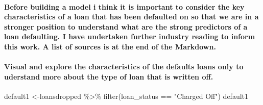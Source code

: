 \documentclass[
]{article}
\newenvironment{Shaded}{\begin{snugshade}}{\end{snugshade}}
\newcommand{\FunctionTok}[1]{\textcolor[rgb]{0.00,0.00,0.00}{#1}}
\newcommand{\NormalTok}[1]{#1}
\newcommand{\OtherTok}[1]{\textcolor[rgb]{0.56,0.35,0.01}{#1}}
\newcommand{\SpecialCharTok}[1]{\textcolor[rgb]{0.00,0.00,0.00}{#1}}
\newcommand{\StringTok}[1]{\textcolor[rgb]{0.31,0.60,0.02}{#1}}
\begin{document}
\hypertarget{before-building-a-model-i-think-it-is-important-to-consider-the-key-characteristics-of-a-loan-that-has-been-defaulted-on-so-that-we-are-in-a-stronger-position-to-understand-what-are-the-strong-predictors-of-a-loan-defaulting.-i-have-undertaken-further-industry-reading-to-inform-this-work.-a-list-of-sources-is-at-the-end-of-the-markdown.}{%
\paragraph{Before building a model i think it is important to consider
the key characteristics of a loan that has been defaulted on so that we
are in a stronger position to understand what are the strong predictors
of a loan defaulting. I have undertaken further industry reading to
inform this work. A list of sources is at the end of the
Markdown.}\label{before-building-a-model-i-think-it-is-important-to-consider-the-key-characteristics-of-a-loan-that-has-been-defaulted-on-so-that-we-are-in-a-stronger-position-to-understand-what-are-the-strong-predictors-of-a-loan-defaulting.-i-have-undertaken-further-industry-reading-to-inform-this-work.-a-list-of-sources-is-at-the-end-of-the-markdown.}}

\hypertarget{visual-and-explore-the-characteristics-of-the-defaults-loans-only-to-uderstand-more-about-the-type-of-loan-that-is-written-off.}{%
\paragraph{Visual and explore the characteristics of the defaults loans
only to uderstand more about the type of loan that is written
off.}\label{visual-and-explore-the-characteristics-of-the-defaults-loans-only-to-uderstand-more-about-the-type-of-loan-that-is-written-off.}}

\begin{Shaded}
\begin{Highlighting}[]
\NormalTok{default1 }\OtherTok{\textless{}{-}}\NormalTok{loansdropped }\SpecialCharTok{\%\textgreater{}\%}
  \FunctionTok{filter}\NormalTok{(loan\_status }\SpecialCharTok{==} \StringTok{"Charged Off"}\NormalTok{)}
\NormalTok{default1}
\end{Highlighting}
\end{Shaded}
\end{document}
